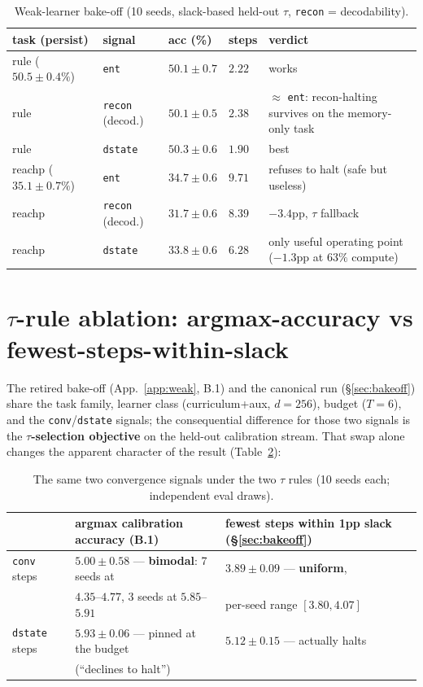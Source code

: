 \documentclass{article}
\newcommand{\sig}[1]{\texttt{#1}}
\begin{document}
\begin{table}[h]
\caption{Weak-learner bake-off (10 seeds, slack-based held-out $\tau$,
\sig{recon} = decodability).}
\label{tab:weak}
\centering
\small
\begin{tabular}{llllp{4.2cm}}
\toprule
task (persist) & signal & acc (\%) & steps & verdict \\
\midrule
rule ($50.5\pm0.4\%$) & \sig{ent} & $50.1\pm0.7$ & $2.22$ & works \\
rule & \sig{recon} (decod.) & $50.1\pm0.5$ & $2.38$ & $\approx$ \sig{ent}: recon-halting survives on the memory-only task \\
rule & \sig{dstate} & $50.3\pm0.6$ & $\mathbf{1.90}$ & best \\
\midrule
reachp ($35.1\pm0.7\%$) & \sig{ent} & $34.7\pm0.6$ & $9.71$ & refuses to halt (safe but useless) \\
reachp & \sig{recon} (decod.) & $31.7\pm0.6$ & $8.39$ & $-3.4$pp, $\tau$ fallback \\
reachp & \sig{dstate} & $33.8\pm0.6$ & $\mathbf{6.28}$ & only useful operating point ($-1.3$pp at $63\%$ compute) \\
\bottomrule
\end{tabular}
\end{table}

\section{$\tau$-rule ablation: argmax-accuracy vs fewest-steps-within-slack}\label{app:tau}

The retired bake-off (App.~\ref{app:weak}, B.1) and the canonical run
(\S\ref{sec:bakeoff}) share the task family, learner class
(curriculum{+}aux, $d{=}256$), budget ($T{=}6$), and the \sig{conv}/\sig{dstate}
signals; the consequential difference for those two signals is the
\textbf{$\tau$-selection objective} on the held-out calibration stream. That
swap alone changes the apparent character of the result
(Table~\ref{tab:taurule}):

\begin{table}[h]
\caption{The same two convergence signals under the two $\tau$ rules
(10 seeds each; independent eval draws).}
\label{tab:taurule}
\centering
\small
\begin{tabular}{lll}
\toprule
 & argmax calibration accuracy (B.1) & fewest steps within 1pp slack (\S\ref{sec:bakeoff}) \\
\midrule
\sig{conv} steps & $5.00\pm0.58$ --- \textbf{bimodal}: 7 seeds at & $3.89\pm0.09$ --- \textbf{uniform}, \\
 & $4.35$--$4.77$, 3 seeds at $5.85$--$5.91$ & per-seed range $[3.80, 4.07]$ \\
\sig{dstate} steps & $5.93\pm0.06$ --- pinned at the budget & $5.12\pm0.15$ --- actually halts \\
 & (``declines to halt'') & \\
\bottomrule
\end{tabular}
\end{table}
\end{document}
